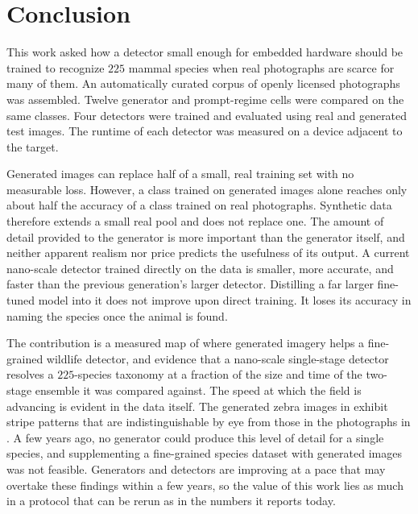 \section{Conclusion}\label{sec:conclusion}

This work asked how a detector small enough for embedded hardware should be trained to recognize $225$ mammal species when real photographs are scarce for many of them. An automatically curated corpus of openly licensed photographs was assembled. Twelve generator and prompt-regime cells were compared on the same classes. Four detectors were trained and evaluated using real and generated test images. The runtime of each detector was measured on a device adjacent to the target.

Generated images can replace half of a small, real training set with no measurable loss. However, a class trained on generated images alone reaches only about half the accuracy of a class trained on real photographs. Synthetic data therefore extends a small real pool and does not replace one. The amount of detail provided to the generator is more important than the generator itself, and neither apparent realism nor price predicts the usefulness of its output. A current nano-scale detector trained directly on the data is smaller, more accurate, and faster than the previous generation's larger detector. Distilling a far larger fine-tuned model into it does not improve upon direct training. It loses its accuracy in naming the species once the animal is found.

The contribution is a measured map of where generated imagery helps a fine-grained wildlife detector, and evidence that a nano-scale single-stage detector resolves a $225$-species taxonomy at a fraction of the size and time of the two-stage ensemble it was compared against. The speed at which the field is advancing is evident in the data itself. The generated zebra images in  exhibit stripe patterns that are indistinguishable by eye from those in the photographs in . A few years ago, no generator could produce this level of detail for a single species, and supplementing a fine-grained species dataset with generated images was not feasible. Generators and detectors are improving at a pace that may overtake these findings within a few years, so the value of this work lies as much in a protocol that can be rerun as in the numbers it reports today.
